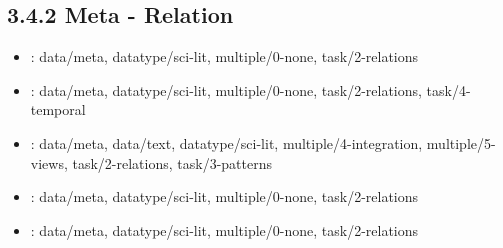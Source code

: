 \begin {refsection}
\section [3.4.2 Meta - Relation] {3.4.2 Meta - Relation}

\begin {itemize}
\item \cite {guo-2013-visualization-to-facilitate-structured-exploration-of-published}:
    data/meta, datatype/sci-lit, multiple/0-none, task/2-relations


\item \cite {hascoet-2012-interactive-graph-matching-and-visual-comparison}:
    data/meta, datatype/sci-lit, multiple/0-none, task/2-relations, task/4-temporal


\item \cite {goerg-2013-combining-computational-analyses-and-interactive-visualization}:
    data/meta, data/text, datatype/sci-lit, multiple/4-integration, multiple/5-views, task/2-relations, task/3-patterns


\item \cite {alsallakh-2013-radial-sets:-interactive-visual-analysis}:
    data/meta, datatype/sci-lit, multiple/0-none, task/2-relations


\item \cite {nesbitt-2004-getting-to-more-abstract-places-using}:
    data/meta, datatype/sci-lit, multiple/0-none, task/2-relations


\end {itemize}
\printbibliography
\end {refsection}\pagebreak

